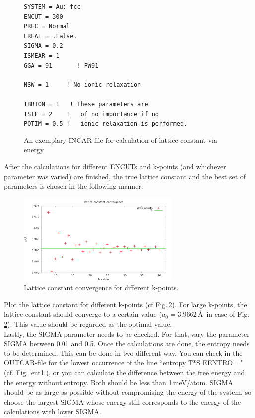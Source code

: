\documentclass[twoside, 11pt, titlepage, captions=nooneline, a4paper, headsepline]{scrbook}%
\newcommand{\9}{\mathrm}
\newcommand{\0}{\,\mathrm}
\begin{document}
\begin{figure}[h!!]
\begin{verbatim}
SYSTEM = Au: fcc
ENCUT = 300     
PREC = Normal   
LREAL = .False. 
SIGMA = 0.2
ISMEAR = 1              
GGA = 91       ! PW91

NSW = 1     ! No ionic relaxation
     
IBRION = 1	 ! These parameters are
ISIF = 2    !   of no importance if no
POTIM = 0.5 !   ionic relaxation is performed.
\end{verbatim}
\caption{An exemplary INCAR-file for calculation of lattice constant via energy}
\label{bincar2}
\end{figure}

After the calculations for different ENCUTs and k-points (and whichever parameter was varied) are finished, the true lattice constant and the best set of parameters is chosen in the following manner:\\
\begin{figure}[h!!]
\centering
\includegraphics[width=0.7\textwidth]{Figures/SingleLatticeConstant.png}
\caption{Lattice constant convergence for different k-points.}
\label{kpfit}
\end{figure}
Plot the lattice constant for different k-points (cf Fig.\,\ref{kpfit}). For large k-points, the lattice constant should converge to a certain value ($a_0=3.9662$\,\AA~in case of Fig.\,\ref{kpfit}). This value should be regarded as the optimal value.\\
Lastly, the SIGMA-parameter needs to be checked. For that, vary the parameter SIGMA between 0.01 and 0.5. Once the calculations are done, the entropy needs to be determined. This can be done in two different way. You can check in the OUTCAR-file for the lowest occurrence of the line ``entropy T*S    EENTRO =" (cf. Fig.\,\ref{ent1}), or you can calculate the difference between the free energy and the energy without entropy. Both should be less than 1\,meV/atom. SIGMA should be as large as possible without compromising the energy of the system, so choose the largest SIGMA whose energy still corresponds to the energy of the calculations with lower SIGMA.\\
\end{document}
